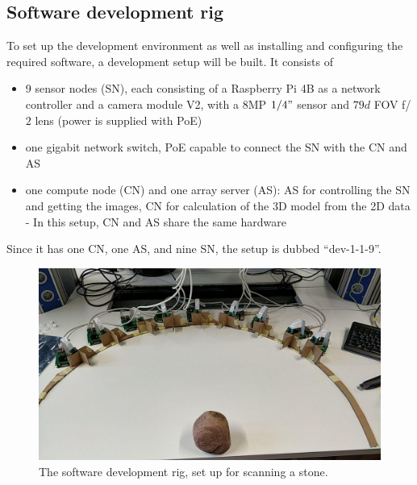 \subsection{Software development rig}
	To set up the development environment as well as installing and configuring the required software, a development setup will be built. It consists of
	\begin{itemize}
		\item 9 sensor nodes (SN), each consisting of a Raspberry Pi 4B as a network controller and a camera module V2, with a $8$MP $1/4"$ sensor and $79d$ FOV f/$2$ lens (power is supplied with PoE)
		\item one gigabit network switch, PoE capable to connect the SN with the CN and AS
		\item one compute node (CN) and one array server (AS): AS for controlling the SN and getting the images, CN for calculation of the 3D model from the 2D data - In this setup, CN and AS share the same hardware
	\end{itemize}

	Since it has one CN, one AS, and nine SN, the setup is dubbed \enquote{dev-1-1-9}.	
	
	\begin{figure}[H]
        \centerline{\includegraphics[width=\linewidth]{how/software-devel-rig-1-1-9.jpg}}
        \caption{The software development rig, set up for scanning a stone.}
    \label{software-devel-rig}
    \end{figure}
	
